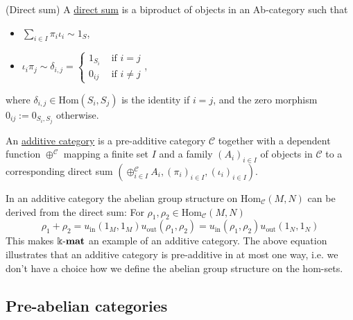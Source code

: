 \begin{definition}{(Direct sum)}\label{def:direct_sum}
A \ul{direct sum} is a biproduct of objects in an Ab-category such that
\begin{itemize}
\item $\sum_{i\in I}  \pi_{i} \iota_{i} \sim 1_{S}$,
\item $ \iota_{i} \pi_{j} \sim \delta_{i, j} =  \begin{cases}
            1_{S_{i}} & \text{ if } i = j  \\
            0_{ij} & \text{ if } i \neq j
        \end{cases}$,
\end{itemize}
where $\delta_{i, j} \in \mathrm{Hom}(S_{i}, S_{j})$ is the identity if $i = j$, and the zero morphism $0_{ij} := 0_{S_{i}, S_{j}}$ otherwise.
\end{definition}

\begin{definition}\label{def:additive_category}
An \ul{additive category} is a pre-additive category $\mathcal{C}$ together with a dependent function $\oplus^{\mathcal{C}}$ mapping
a finite set $I$ and a family $(A_{i})_{i\in I}$ of objects in $\mathcal{C}$ to a corresponding direct sum $(\oplus_{i\in I}^{\mathcal{C}} A_{i},
(\pi_{i})_{i\in I}, (\iota_{i})_{i\in I})$.
\end{definition}

\begin{remark}
In an additive category the abelian group structure on $\mathrm{Hom}_{\mathcal{C}}(M,N)$ can be derived from the direct sum:
For $\rho_{1}, \rho_{2} \in \mathrm{Hom}_{\mathcal{C}}(M,N)$
\[
\rho_{1} + \rho_{2} = u_{\mathrm{in}}(1_{M},1_{M}) u_{\mathrm{out}}(\rho_{1},\rho_{2}) 
= u_{\mathrm{in}}(\rho_{1},\rho_{2}) u_{\mathrm{out}}(1_{N},1_{N})
\]
This makes $\Bbbk\textnormal{-}\mathbf{mat}$ an example of an additive category. The above equation illustrates that an additive category is
pre-additive in at most one way, i.e. we don't have a choice how we define the abelian group structure on the hom-sets.
\end{remark}

\subsection{Pre-abelian categories}


